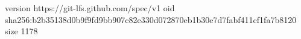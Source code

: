 version https://git-lfs.github.com/spec/v1
oid sha256:b2b35138d0b9f9fd9bb907c82e330d072870eb1b30e7d7fabf411cf1fa7b8120
size 1178
